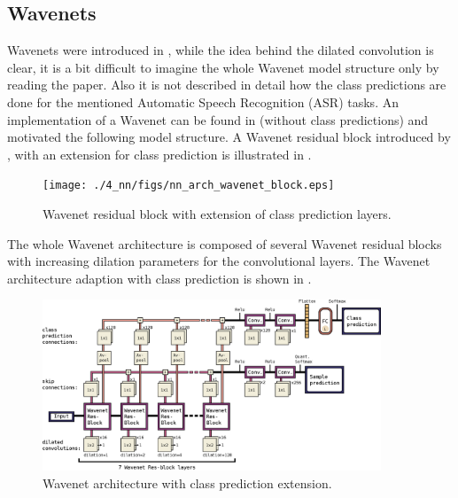\subsection{Wavenets}\label{sec:nn_arch_wavenet}
Wavenets were introduced in \cite{Oord2016}, while the idea behind the dilated convolution is clear, it is a bit difficult to imagine the whole Wavenet model structure only by reading the paper.
Also it is not described in detail how the class predictions are done for the mentioned Automatic Speech Recognition (ASR) tasks.
An implementation of a Wavenet can be found in \cite{Herrmann2018} (without class predictions) and motivated the following model structure.
A Wavenet residual block introduced by \cite{Oord2016}, with an extension for class prediction is illustrated in  .
\begin{figure}[!ht]
  \centering
    \texttt{[image: ./4\_nn/figs/nn\_arch\_wavenet\_block.eps]}
  \caption{Wavenet residual block \cite{Oord2016} with extension of class prediction layers.}
  \label{fig:nn_arch_wavenet_block}
\end{figure}
\FloatBarrier
\noindent
The whole Wavenet architecture is composed of several Wavenet residual blocks with increasing dilation parameters for the convolutional layers.
The Wavenet architecture adaption with class prediction is shown in .
\begin{figure}[!ht]
  \centering
    \includegraphics[width=0.9\textwidth]{./4_nn/figs/nn_arch_wavenet_all.eps}
  \caption{Wavenet architecture with class prediction extension.}
  \label{fig:nn_arch_wavenet_all}
\end{figure}
\FloatBarrier
\noindent

